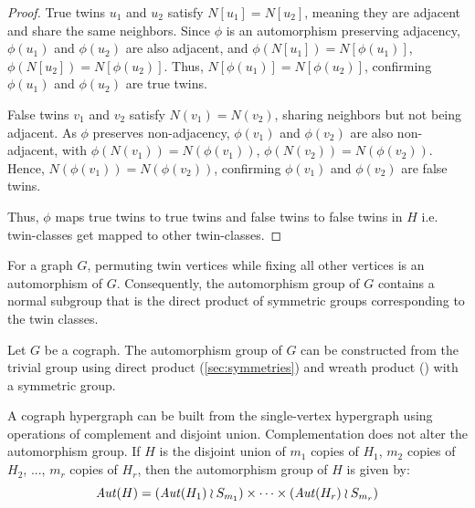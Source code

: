\begin{proof}
True twins $u_1$ and $u_2$ satisfy $N[u_1]=N[u_2]$, meaning they are adjacent and share the same neighbors. Since $\phi$ is an automorphism preserving adjacency, $\phi(u_1)$ and $\phi(u_2)$ are also adjacent, and $\phi(N[u_1])=N[\phi(u_1)]$, $\phi(N[u_2])=N[\phi(u_2)]$. Thus, $N[\phi(u_1)]=N[\phi(u_2)]$, confirming $\phi(u_1)$ and $\phi(u_2)$ are true twins.

False twins $v_1$ and $v_2$ satisfy $N(v_1)=N(v_2)$, sharing neighbors but not being adjacent. As $\phi$ preserves non-adjacency, $\phi(v_1)$ and $\phi(v_2)$ are also non-adjacent, with $\phi(N(v_1))=N(\phi(v_1))$, $\phi(N(v_2))=N(\phi(v_2))$. Hence, $N(\phi(v_1))=N(\phi(v_2))$, confirming $\phi(v_1)$ and $\phi(v_2)$ are false twins.

Thus, $\phi$ maps true twins to true twins and false twins to false twins in $H$ i.e. twin-classes get mapped to other twin-classes.
\end{proof}

For a graph $G$, permuting twin vertices while fixing all other vertices is an automorphism of $G$. Consequently, the automorphism group of $G$ contains a normal subgroup that is the direct product of symmetric groups corresponding to the twin classes.

\begin{proposition}\label{prop:cameron}
Let $G$ be a cograph. The automorphism group of $G$ can be constructed from the trivial group using direct product (\ref{sec:symmetries}) and wreath product (\cite{wreath-missing}) with a symmetric group. \cite{Cam22}
\end{proposition}

A cograph hypergraph can be built from the single-vertex hypergraph using operations of complement and disjoint union. Complementation does not alter the automorphism group. If $H$ is the disjoint union of $m_1$ copies of $H_1$, $m_2$ copies of $H_2$, ..., $m_r$ copies of $H_r$, then the automorphism group of $H$ is given by:
\[
\mathit{Aut}(H)=(\mathit{Aut}(H_1)\wr S_{m_1})\times\dots\times(\mathit{Aut}(H_r)\wr S_{m_r})
\]
